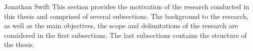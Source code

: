 \hfill {}

\hfill Jonathan Swift
This section provides the motivation of the research conducted in this thesis and comprised of 
several subsections.
The background to the research, as well as the main objectives, the scope and delimitations of 
the research are considered in the first subsections.
The last subsections contains the structure of the thesis.